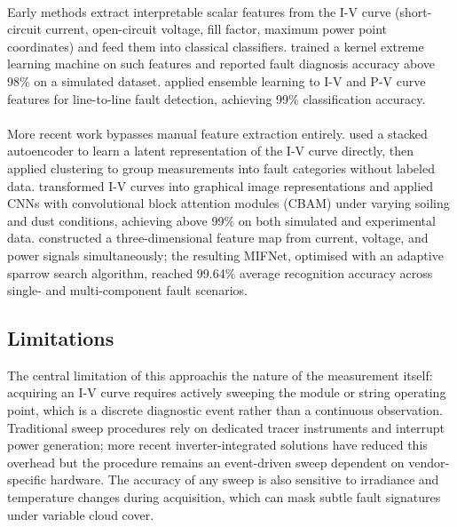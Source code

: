 \paragraph{}
Early methods extract interpretable scalar features from the I-V curve (short-circuit current, open-circuit voltage, fill factor, maximum power point coordinates) and feed them into classical classifiers. \citet{chen2017} trained a kernel extreme learning machine on such features and reported fault diagnosis accuracy above 98\% on a simulated dataset. \citet{eskandari2020} applied ensemble learning to I-V and P-V curve features for line-to-line fault detection, achieving 99\% classification accuracy.

\paragraph{}
More recent work bypasses manual feature extraction entirely. \citet{liu2021sae} used a stacked autoencoder to learn a latent representation of the I-V curve directly, then applied clustering to group measurements into fault categories without labeled data. \citet{qu2024dust} transformed I-V curves into graphical image representations and applied CNNs with convolutional block attention modules (CBAM) under varying soiling and dust conditions, achieving above 99\% on both simulated and experimental data. \citet{gong2024deep} constructed a three-dimensional feature map from current, voltage, and power signals simultaneously; the resulting MIFNet, optimised with an adaptive sparrow search algorithm, reached 99.64\% average recognition accuracy across single- and multi-component fault scenarios.

\subsection{Limitations}
The central limitation of this approachis the nature of the measurement itself: acquiring an I-V curve requires actively sweeping the module or string operating point, which is a discrete diagnostic event rather than a continuous observation. Traditional sweep procedures rely on dedicated tracer instruments and interrupt power generation; more recent inverter-integrated solutions have reduced this overhead but the procedure remains an event-driven sweep dependent on vendor-specific hardware. The accuracy of any sweep is also sensitive to irradiance and temperature changes during acquisition, which can mask subtle fault signatures under variable cloud cover.

